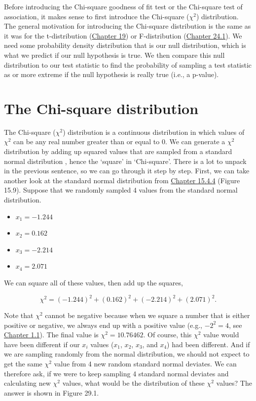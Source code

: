 \documentclass[
  openany]{scrbook}
\providecommand{\tightlist}{%
  \setlength{\itemsep}{0pt}\setlength{\parskip}{0pt}}
\begin{document}
Before introducing the Chi-square goodness of fit test or the Chi-square test of association, it makes sense to first introduce the Chi-square (\(\chi^{2}\)) distribution.
The general motivation for introducing the Chi-square distribution is the same as it was for the t-distribution (\protect\hyperlink{Chapter_19}{Chapter 19}) or F-distribution (\protect\hyperlink{the-f-distribution}{Chapter 24.1}).
We need some probability density distribution that is our null distribution, which is what we predict if our null hypothesis is true.
We then compare this null distribution to our test statistic to find the probability of sampling a test statistic as or more extreme if the null hypothesis is really true (i.e., a p-value).

\hypertarget{the-chi-square-distribution}{%
\section{The Chi-square distribution}\label{the-chi-square-distribution}}

The Chi-square (\(\chi^{2}\)) distribution is a continuous distribution in which values of \(\chi^{2}\) can be any real number greater than or equal to 0. We can generate a \(\chi^{2}\) distribution by adding up squared values that are sampled from a standard normal distribution \citep{Sokal1995}, hence the `square' in `Chi-square'.
There is a lot to unpack in the previous sentence, so we can go through it step by step.
First, we can take another look at the standard normal distribution from \protect\hyperlink{normal-distribution}{Chapter 15.4.4} (Figure 15.9).
Suppose that we randomly sampled 4 values from the standard normal distribution.

\begin{itemize}
\tightlist
\item
  \(x_{1} = -1.244\)
\item
  \(x_{2} = 0.162\)
\item
  \(x_{3} = -2.214\)
\item
  \(x_{4} = 2.071\)
\end{itemize}

We can square all of these values, then add up the squares,

\[\chi^{2} = (-1.244)^{2} + (0.162)^{2} + (-2.214)^{2} + (2.071)^{2}.\]

Note that \(\chi^{2}\) cannot be negative because when we square a number that is either positive or negative, we always end up with a positive value (e.g., \(-2^{2} = 4\), see \protect\hyperlink{numbers-and-operations}{Chapter 1.1}).
The final value is \(\chi^{2} = 10.76462\).
Of course, this \(\chi^{2}\) value would have been different if our \(x_{i}\) values (\(x_{1}\), \(x_{2}\), \(x_{3}\), and \(x_{4}\)) had been different.
And if we are sampling randomly from the normal distribution, we should not expect to get the same \(\chi^{2}\) value from 4 new random standard normal deviates.
We can therefore ask, if we were to keep sampling 4 standard normal deviates and calculating new \(\chi^{2}\) values, what would be the distribution of these \(\chi^{2}\) values?
The answer is shown in Figure 29.1.
\end{document}
